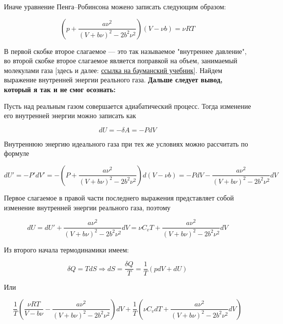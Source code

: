 \documentclass[a4paper,14pt]{article}
\theoremstyle{plain} %
\theoremstyle{definition} %
\theoremstyle{remark} %
\begin{document}
Иначе уравнение Пенга--Робинсона можено записать следующим образом:

\begin{equation}
	\left(p + \frac{a \nu^2}{(V + b \nu)^2 - 2 b^2 \nu^2}\right)(V - \nu b) = \nu R T
\end{equation}

В первой скобке второе слагаемое --- это так называемое "внутреннее давление", во второй скобке второе слагаемое является поправкой на объем, занимаемый молекулами газа [здесь и далее: \href{http://fn.bmstu.ru/data-physics/library/physbook/tom2/ch2/texthtml/ch2_7.htm}{ссылка на бауманский учебник}]. Найдем выражение внутренней энергии реального газа. \textbf{Дальше следует вывод, который я так и не смог осознать:}

Пусть над реальным газом совершается адиабатический процесс. Тогда изменение его внутренней энергии можно записать как

\begin{equation}
	d U = - \delta A = - P d V
\end{equation}

Внутреннюю энергию идеального газа при тех же условиях можно рассчитать по формуле

\begin{equation}
	d U' = - P' d V' = - \left(P + \frac{a \nu^2}{(V + b \nu)^2 - 2 b^2 \nu^2} \right) d (V - \nu b) = - P d V - \frac{a \nu^2}{(V + b \nu)^2 - 2 b^2 \nu^2} d V
\end{equation}

Первое слагаемое в правой части последнего выражения представляет собой изменение внутренней энергии реального газа, поэтому

\begin{equation}
	d U = d U' + \frac{a \nu^2}{(V + b \nu)^2 - 2 b^2 \nu^2} d V = \nu C_v T + \frac{a \nu^2}{(V + b \nu)^2 - 2 b^2 \nu^2} d V
\end{equation}

Из второго начала термодинамики имеем:

\begin{equation}
	\delta Q = T d S \Longrightarrow d S = \frac{\delta Q}{T} = \frac{1}{T} \left(p d V + d U\right)
\end{equation}

Или

\begin{equation}
	\frac{1}{T} \left(\frac{\nu R T}{V - b \nu} - \frac{a \nu^2}{(V + b \nu)^2 - 2 b^2 \nu^2}\right) d V + \frac{1}{T}(\nu C_v dT + \frac{a \nu^2}{(V + b \nu)^2 - 2 b^2 \nu^2} d V) 
\end{equation}
\end{document}
